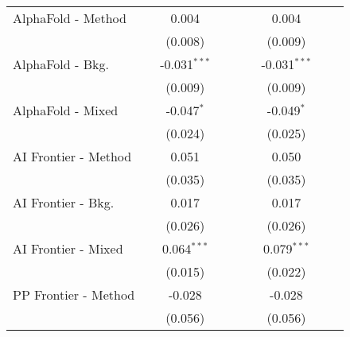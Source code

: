 \begin{tabular}{lcccccccc}
   AlphaFold - Method                             &               & 0.004          &        &        &               & 0.004          &        &   \\   
                                                  &               & (0.008)        &        &        &               & (0.009)        &        &   \\   
   AlphaFold - Bkg.                               &               & -0.031$^{***}$ &        &        &               & -0.031$^{***}$ &        &   \\   
                                                  &               & (0.009)        &        &        &               & (0.009)        &        &   \\   
   AlphaFold - Mixed                              &               & -0.047$^{*}$   &        &        &               & -0.049$^{*}$   &        &   \\   
                                                  &               & (0.024)        &        &        &               & (0.025)        &        &   \\   
   AI Frontier - Method                           &               & 0.051          &        &        &               & 0.050          &        &   \\   
                                                  &               & (0.035)        &        &        &               & (0.035)        &        &   \\   
   AI Frontier - Bkg.                             &               & 0.017          &        &        &               & 0.017          &        &   \\   
                                                  &               & (0.026)        &        &        &               & (0.026)        &        &   \\   
   AI Frontier - Mixed                            &               & 0.064$^{***}$  &        &        &               & 0.079$^{***}$  &        &   \\   
                                                  &               & (0.015)        &        &        &               & (0.022)        &        &   \\   
   PP Frontier - Method                           &               & -0.028         &        &        &               & -0.028         &        &   \\   
                                                  &               & (0.056)        &        &        &               & (0.056)        &        &   \\   

\end{tabular}
